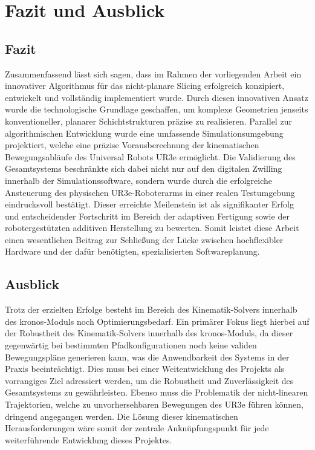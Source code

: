 \chapter{Fazit und Ausblick}\label{chap:conclusion-and-outlook}
    \section{Fazit}\label{sec:conclusion}
        Zusammenfassend lässt sich sagen, dass im Rahmen der vorliegenden Arbeit ein innovativer Algorithmus für das nicht-planare Slicing erfolgreich konzipiert, entwickelt und vollständig implementiert wurde.
        Durch diesen innovativen Ansatz wurde die technologische Grundlage geschaffen, um komplexe Geometrien jenseits konventioneller, planarer Schichtstrukturen präzise zu realisieren.
        Parallel zur algorithmischen Entwicklung wurde eine umfassende Simulationsumgebung projektiert, welche eine präzise Vorausberechnung der kinematischen Bewegungsabläufe des Universal Robots UR3e ermöglicht.
        Die Validierung des Gesamtsystems beschränkte sich dabei nicht nur auf den digitalen Zwilling innerhalb der Simulationssoftware, sondern wurde durch die erfolgreiche Ansteuerung des physischen UR3e-Roboterarms in einer realen Testumgebung eindrucksvoll bestätigt.
        Dieser erreichte Meilenstein ist als signifikanter Erfolg und entscheidender Fortschritt im Bereich der adaptiven Fertigung sowie der robotergestützten additiven Herstellung zu bewerten.
        Somit leistet diese Arbeit einen wesentlichen Beitrag zur Schließung der Lücke zwischen hochflexibler Hardware und der dafür benötigten, spezialisierten Softwareplanung.

    \section{Ausblick} \label{sec:outlook}
        Trotz der erzielten Erfolge besteht im Bereich des Kinematik-Solvers innerhalb des \ac{kronos}-Moduls noch Optimierungsbedarf.
        Ein primärer Fokus liegt hierbei auf der Robustheit des Kinematik-Solvers innerhalb des \ac{kronos}-Moduls, da dieser gegenwärtig bei bestimmten Pfadkonfigurationen noch keine validen Bewegungspläne generieren kann, was die Anwendbarkeit des Systems in der Praxis beeinträchtigt.
        Dies muss bei einer Weitentwicklung des Projekts als vorrangiges Ziel adressiert werden, um die Robustheit und Zuverlässigkeit des Gesamtsystems zu gewährleisten.
        Ebenso muss die Problematik der nicht-linearen Trajektorien, welche zu unvorhersehbaren Bewegungen des UR3e führen können, dringend angegangen werden.
        Die Lösung dieser kinematischen Herausforderungen wäre somit der zentrale Anknüpfungspunkt für jede weiterführende Entwicklung dieses Projektes.
            

